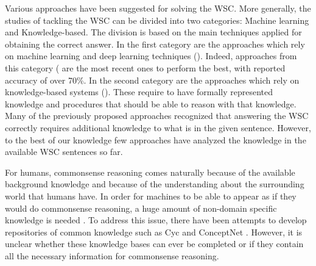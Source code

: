 Various approaches have been suggested for solving the WSC.
More generally, the studies of tackling the WSC can be divided into two categories: Machine learning and Knowledge-based. 
The division is based on the main techniques applied for obtaining the correct answer. In the first category are the approaches which rely on machine learning and deep learning techniques (\cite{DBLP:conf/emnlp/RahmanN12, DBLP:journals/corr/LiuJLZWH16,  DBLP:journals/corr/abs-1806-02847}). Indeed, approaches from this category (\cite{DBLP:journals/corr/abs-1806-02847, radford2019language} are the most recent ones to perform the best, with reported accuracy of over 70\%. In the second category are the approaches which rely on knowledge-based systems (\cite{DBLP:conf/aaai/SharmaB16,DBLP:conf/emnlp/EmamiCTSC18,DBLP:conf/kr/Schuller14}). These require to have formally represented knowledge and procedures that should be able to reason with that knowledge. Many of the previously proposed approaches \cite{DBLP:conf/ijcai/SharmaVAB15, DBLP:conf/kr/Schuller14, DBLP:journals/corr/LiuJLZWH16, DBLP:conf/emnlp/EmamiCTSC18} recognized that answering the WSC correctly requires additional knowledge to what is in the given sentence. However, to the best of our knowledge few approaches have analyzed the knowledge in the available WSC sentences so far. 


For humans, commonsense reasoning comes naturally  because of the available background knowledge and because of the understanding about the surrounding world that humans have. In order for machines to be able to appear as if they would do commonsense reasoning, a huge amount of non-domain specific knowledge is needed \cite{DBLP:journals/ibmsj/McCarthyMSGLMMRSS02}. To address this issue, there have been attempts to develop repositories of common knowledge such as Cyc \cite{DBLP:journals/cacm/Lenat95} and ConceptNet \cite{articleC}. However, it is unclear whether these knowledge bases can ever be completed or if they contain all the necessary information for commonsense reasoning. 


